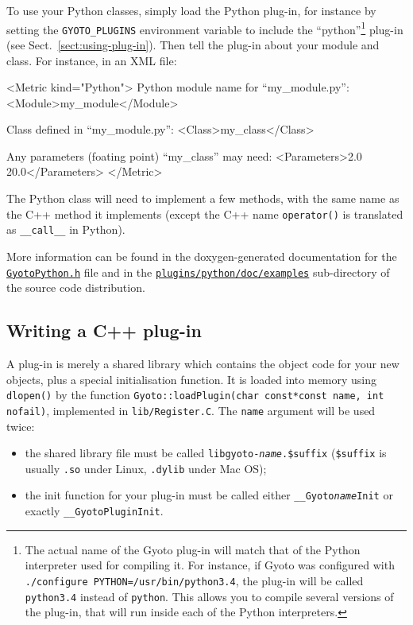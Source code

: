 \documentclass[a4paper,12pt]{article}
\begin{document}
To use your Python classes, simply load the Python plug-in, for
instance by setting the \texttt{GYOTO\_PLUGINS} environment variable
to include the ``python''\footnote{The actual name of the Gyoto plug-in
  will match that of the Python interpreter used for compiling it. For
  instance, if Gyoto was configured with \texttt{./configure
    PYTHON=/usr/bin/python3.4}, the plug-in will be called
  \texttt{python3.4} instead of \texttt{python}. This allows you to
  compile several versions of the plug-in, that will run inside each
  of the Python interpreters.} plug-in (see
Sect.~\ref{sect:using-plug-in}). Then tell the plug-in about your
module and class. For instance, in an XML file:
\begin{code}
  <Metric kind="Python">
   Python module name for ``my_module.py'':
    <Module>my_module</Module>

   Class defined in ``my_module.py'':
    <Class>my_class</Class>

   Any parameters (foating point) ``my_class'' may need:
    <Parameters>2.0 20.0</Parameters>
  </Metric>
\end{code}

The Python class will need to implement a few methods, with the same
name as the C++ method it implements (except the C++ name
\texttt{operator()} is translated as \texttt{\_\_call\_\_} in Python).

More information can be found in the doxygen-generated documentation
for the
\href{https://github.com/gyoto/Gyoto/blob/master/plugins/python/include/GyotoPython.h}{\texttt{GyotoPython.h}}
file and in the
\href{https://github.com/gyoto/Gyoto/tree/master/plugins/python/doc/examples}{\texttt{plugins/python/doc/examples}}
sub-directory of the source code distribution.

\subsection{Writing a C++ plug-in}
\label{sect:plug-in}

A plug-in is merely a shared library which contains the object code
for your new objects, plus a special initialisation function. It is
loaded into memory using \texttt{dlopen()} by the function
\texttt{Gyoto::loadPlugin(char const*const name, int nofail)},
implemented in \texttt{lib/Register.C}. The \texttt{name} argument
will be used twice:
\begin{itemize}
\item the shared library file must be called
  \texttt{libgyoto-\emph{name}.\$suffix} (\texttt{\$suffix} is usually
  \texttt{.so} under Linux, \texttt{.dylib} under Mac OS);
\item the init function for your plug-in must be called either
  \texttt{\_\_Gyoto\emph{name}Init} or exactly
  \texttt{\_\_GyotoPluginInit}.
\end{itemize}
\end{document}
